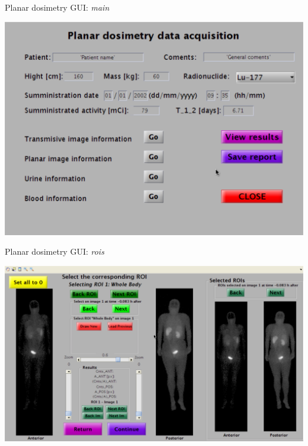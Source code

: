 \documentclass[ignorenonframetext,]{beamer}
\begin{document}
\begin{frame}{Planar dosimetry GUI: \emph{main}}
\protect\hypertarget{planar-dosimetry-gui-main}{}

\includegraphics{imgs/planar-gui.png}

\end{frame}

\begin{frame}{Planar dosimetry GUI: \emph{rois}}
\protect\hypertarget{planar-dosimetry-gui-rois}{}

\includegraphics{imgs/planar-rois.png}

\end{frame}
\end{document}
